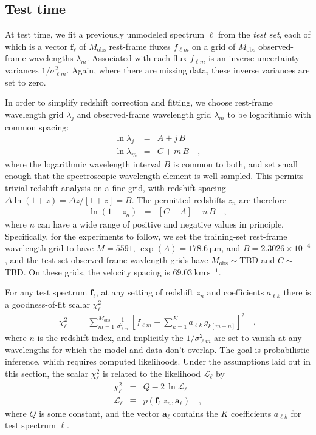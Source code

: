 \documentclass[preprint]{aastex}
\newcommand{\unit}[1]{\mathrm{#1}}
\newcommand{\km}{\unit{km}}
\newcommand{\s}{\unit{s}}
\newcommand{\kmps}{\km\,\s^{-1}}
\newcommand{\mum}{\unit{\mu m}}
\newcommand{\mmatrix}[1]{\boldsymbol{#1}}
\newcommand{\avec}{\mmatrix{a}}
\newcommand{\fvec}{\mmatrix{f}}
\newcommand{\obs}{\mathrm{obs}}
\newcommand{\like}{\mathscr{L}}
\begin{document}
\subsection{Test time}

At test time, we fit a previously unmodeled spectrum $\ell$ from the
\emph{test set}, each of which is a vector $\fvec_\ell$ of $M_\obs$
rest-frame fluxes $f_{\ell m}$ on a grid of $M_\obs$ observed-frame
wavelengths $\lambda_m$.  Associated with each flux $f_{\ell m}$ is an
inverse uncertainty variances $1/\sigma^2_{\ell m}$.  Again, where
there are missing data, these inverse variances are set to zero.

In order to simplify redshift correction and fitting, we choose
rest-frame wavelength grid $\lambda_j$ and observed-frame wavelength
grid $\lambda_m$ to be logarithmic with common spacing:
\begin{eqnarray}\displaystyle
\ln\lambda_j &=& A + j\,B \nonumber\\
\ln\lambda_m &=& C + m\,B
\quad ,
\end{eqnarray}
where the logarithmic wavelength interval $B$ is common to both, and
set small enough that the spectroscopic wavelength element is well
sampled.  This permits trivial redshift analysis on a fine grid, with
redshift spacing $\Delta\ln(1+z)=\Delta z/[1+z]=B$.  The permitted
redshifts $z_n$ are therefore
\begin{eqnarray}\displaystyle
\ln(1+z_n) &=& [C - A] + n\,B
\quad ,
\end{eqnarray}
where $n$ can have a wide range of positive and negative values in
principle.  Specifically, for the experiments to follow, we set the
training-set rest-frame wavelength grid to have $M=5591$,
$\exp(A)=178.6~\mum$, and $B=2.3026\times10^{-4}$, and the test-set
observed-frame wavlength grids have $M_\obs\sim$TBD and $C\sim$TBD.
On these grids, the velocity spacing is $69.03~\kmps$.

For any test spectrum $\fvec_\ell$, at any setting of redshift $z_n$
and coefficients $a_{\ell k}$ there is a goodness-of-fit scalar
$\chi^2_\ell$
\begin{eqnarray}\displaystyle
\chi^2_\ell &=& \sum_{m=1}^{M_\obs} \frac{1}{\sigma^2_{\ell m}}
 \,\left[f_{\ell m} - \sum_{k=1}^K a_{\ell k}\,g_{k[m-n]}\right]^2
\quad,
\end{eqnarray}
where $n$ is the redshift index, and implicitly the $1/\sigma^2_{\ell
  m}$ are set to vanish at any wavelengths for which the model and
data don't overlap.  The goal is probabilistic inference, which
requires computed likelihoods.  Under the assumptions laid out in this
section, the scalar $\chi^2_\ell$ is related to the likelihood
$\like_\ell$ by
\begin{eqnarray}\displaystyle
\chi^2_\ell &=& Q - 2\,\ln\like_\ell \nonumber\\
\like_\ell &\equiv& p(\fvec_\ell|z_n,\avec_\ell)
\quad ,
\end{eqnarray}
where $Q$ is some constant, and the vector $\avec_\ell$ contains the
$K$ coefficients $a_{\ell k}$ for test spectrum $\ell$.
\end{document}
